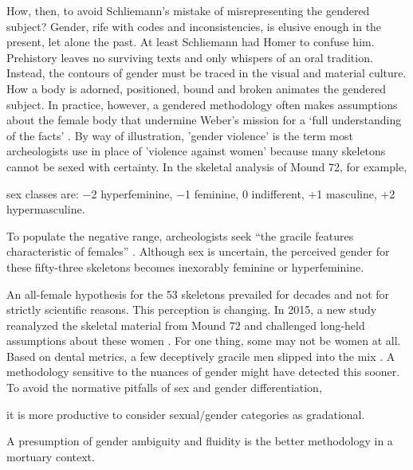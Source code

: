 How, then, to avoid Schliemann's mistake of misrepresenting the gendered subject? Gender, rife with codes and inconsistencies, is elusive enough in the present, let alone the past. At least Schliemann had Homer to confuse him. Prehistory leaves no surviving texts and only whispers of an oral tradition. Instead, the contours of gender must be traced in the visual and material culture. How a body is adorned, positioned, bound and broken animates the gendered subject. In practice, however, a gendered methodology often makes assumptions about the female body that undermine Weber's mission for a \enquote*{full understanding of the facts} \parencite[146]{weber1946}. By way of illustration, 'gender violence' is the term most archeologists use in place of 'violence against women' because many skeletons cannot be sexed with certainty. In the skeletal analysis of Mound 72, for example, \begin{IJSRAquote}{\cite[63]{fowler1999}}sex classes are: \num{-2} hyperfeminine, \num{-1} feminine, \num{0} indifferent, +1 masculine, +2 hypermasculine.\end{IJSRAquote} To populate the negative range, archeologists seek \enquote{the gracile features characteristic of females} \parencite[54]{fowler1999}. Although sex is uncertain, the perceived gender for these fifty-three skeletons becomes inexorably feminine or hyperfeminine. 

An all-female hypothesis for the 53 skeletons prevailed for decades and not for strictly scientific reasons. This perception is changing. In 2015, a new study reanalyzed the skeletal material from Mound 72 and challenged long-held assumptions about these women \parencite[]{slater2014}. For one thing, some may not be women at all. Based on dental metrics, a few deceptively gracile men slipped into the mix \parencite[]{thompson2013}. A methodology sensitive to the nuances of gender might have detected this sooner. To avoid the normative pitfalls of sex and gender differentiation, \begin{IJSRAquote}{\cite[3]{rautman2000}}it is more productive to consider sexual/gender categories as gradational.\end{IJSRAquote} A presumption of gender ambiguity and fluidity is the better methodology in a mortuary context. 

